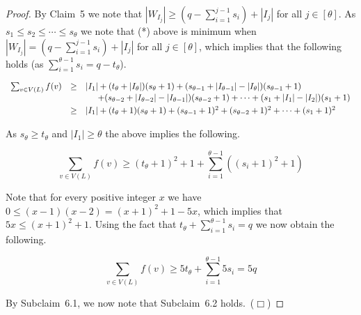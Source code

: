 \documentclass{article}
\newcommand{\smallqed}{\hfill {\tiny ($\Box$)}}
\newcommand{\eqSp}{\vspace{0.1cm}}
\newcommand{\2}{\vspace{2mm}}
\theoremstyle{plain}
\theoremstyle{definition}
\begin{document}
\begin{proof}
By Claim~5 we note that $|W_{I_j}| \geq (q-\sum_{i=1}^{j-1} s_i)+|I_j|$ for all $j \in [\theta]$.
As $s_1 \leq s_2 \leq \cdots \leq s_{\theta}$ we note that (*) above is minimum when 
$|W_{I_j}| = (q-\sum_{i=1}^{j-1} s_i)+|I_j|$ for all $j \in [\theta]$, which implies that the following holds (as
$\sum_{i=1}^{\theta-1} s_i = q -t_{\theta}$).

\[
\begin{array}{rcl} 
\sum_{v \in V(L)} f(v) & \geq &  |I_1| + (t_{\theta}+|I_{\theta}|)(s_{\theta}+1) 
+ (s_{\theta-1}+|I_{\theta-1}|-|I_{\theta}|)(s_{\theta-1}+1)  \\ \eqSp{}
& & \hspace{0.5cm} + (s_{\theta-2}+|I_{\theta-2}|-|I_{\theta-1}|)(s_{\theta-2}+1)  +  \cdots  + (s_{1}+|I_{1}|-|I_2|)(s_{1}+1) \\
 & \geq & |I_1| + (t_{\theta}+1)(s_{\theta}+1) 
+ (s_{\theta-1}+1)^2
+ (s_{\theta-2}+1)^2
+  \cdots 
+ (s_{1}+1)^2 \\
\end{array}
\]

As $s_{\theta} \geq t_{\theta}$ and $|I_1| \geq \theta$ the above implies the following.

\[
\sum_{v \in V(L)} f(v)  \geq  (t_{\theta}+1)^2 + 1 + \sum_{i=1}^{\theta -1} ((s_i+1)^2 + 1)
\]

Note that for every positive integer $x$ we have $0 \leq (x-1)(x-2) = (x+1)^2+1- 5x$,
which implies that $5x \leq (x+1)^2+1$.  Using the fact that $t_{\theta} + \sum_{i=1}^{\theta -1} s_i = q$
we now obtain the following.

\[
\sum_{v \in V(L)} f(v)  \geq  5t_{\theta} + \sum_{i=1}^{\theta -1} 5s_i = 5q
\]

By Subclaim~6.1, we now note that Subclaim~6.2 holds.~\smallqed{}

\end{proof}




\end{document}
